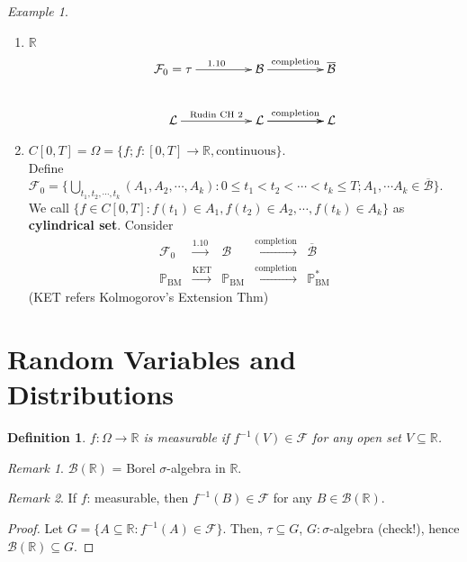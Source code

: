 \documentclass[12pt]{report}
\renewcommand{\subset}{\subseteq}
\theoremstyle{break}
\theoremstyle{newdef}
\newtheorem{defn}[thm]{Definition} %
\theoremstyle{remark}
\newtheorem*{exmp}{Example} %
\newtheorem*{rem}{Remark} %
\begin{document}
\begin{exmp}
\leavevmode
\begin{enumerate}[label = \arabic*)]
\item $\mathbb{R}$
$$
\xymatrix@R+0.25em@C+2em{
\ar @{} [dr] |{}
\mathcal{F}_0 = \tau \ar[r]^{1.10} & \mathcal{B} \ar[r]^{\text{completion}} & \overline{\mathcal{B}}\\
\mathcal{L} \ar[r]^{\text{Rudin CH 2}} & \mathcal{L} \ar[r]^{\text{completion}} \ar[r] & \mathcal{L}
}
$$



\item $C[0,T] = \Omega = \{f ; f : [0,T] \rightarrow \mathbb{R}, \text{continuous}\}$.\\
Define $\mathcal{F}_0 = \{\bigcup_{t_1,t_2,\cdots,t_k}(A_1,A_2,\cdots,A_k)
: 0 \leq t_1 < t_2 < \cdots < t_k \leq T; A_1, \cdots A_k \in \overline{\mathcal{B}}
\}$.
We call $\{f \in C[0,T]: f(t_1) \in A_1, f(t_2) \in A_2, \cdots, f(t_k) \in A_k\}$ as \textbf{cylindrical set}.
Consider
$$
\begin{aligned}
\mathcal{F}_0 &\overset{1.10}{\longrightarrow} &\mathcal{B} &\overset{\text{completion}}{\longrightarrow} &\overline{\mathcal{B}}\\
\mathbb{P}_{\text{BM}} &\overset{\text{KET}}{\longrightarrow} &\mathbb{P}_{\text{BM}} &\overset{\text{completion}}{\longrightarrow} &\mathbb{P}^*_{\text{BM}}
\end{aligned}
$$
(KET refers Kolmogorov's Extension Thm)
\end{enumerate}
\end{exmp}

\section{Random Variables and Distributions}
\begin{defn}
$f : \Omega \rightarrow \mathbb{R}$ is measurable if $f^{-1}(V) \in \mathcal{F}$ for any open set $V \subset \mathbb{R}$.
\end{defn}

\begin{rem}
$\mathcal{B}(\mathbb{R})$ = Borel $\sigma$-algebra in $\mathbb{R}$.
\end{rem}

\begin{rem}
If $f$: measurable, then $f^{-1}(B) \in \mathcal{F}$ for any $B \in \mathcal{B}(\mathbb{R})$.
\begin{proof}
Let $G = \{ A \subset \mathbb{R} : f^{-1}(A) \in \mathcal{F} \}$.
Then, $\tau \subset G$, $G: \sigma$-algebra (check!), hence $\mathcal{B}(\mathbb{R}) \subset G$.
\end{proof}
\end{rem}
\end{document}
